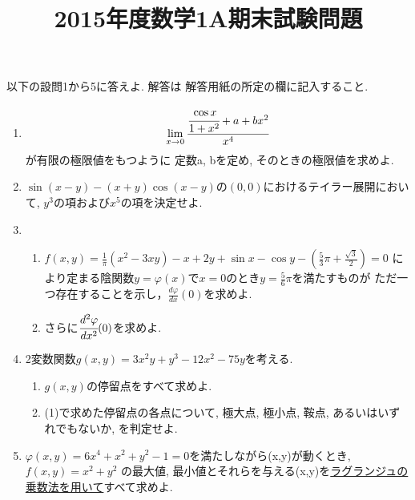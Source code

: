 \documentclass[a4paper,12pt,report]{amsart}
\title{2015年度数学1A期末試験問題}
\begin{document}
    \maketitle
以下の設問1から5に答えよ. 解答は 解答用紙の所定の欄に記入すること.
\begin{enumerate}
    \item 
    \begin{equation*}
        \lim_{x\to 0}\cfrac{\cfrac{\cos x}{1+x^{2}}+a+bx^{2}}{x^{4}}
    \end{equation*}
    が有限の極限値をもつように
    定数a, bを定め, そのときの極限値を求めよ.
    \item 
        \(\sin(x-y)-(x+y)\cos(x-y)\)の\((0,0)\)におけるテイラー展開において, \(y^{3}\)の項および\(x^{5}\)の項を決定せよ.
    \item 
    \begin{enumerate}
        \item \(f(x,y)=\frac{1}{\pi}(x^{2}-3xy)-x+2y+\sin{x}-\cos{y}-(\frac{5}{3}\pi+\frac{\sqrt{3}}{2})=0\)
        により定まる陰関数\(y=\varphi(x)\)で\(x=0\)のとき\(y=\frac{5}{6}\pi{}\)を満たすものが
        ただ一つ存在することを示し，\(\frac{d\varphi}{dx}(0)\)を求めよ.
        \item さらに\(\cfrac{d^{2}\varphi}{dx^{2}}(0)\)を求めよ.
    \end{enumerate}
    \item 
    2変数関数\(g(x,y)=3x^{2}y+y^{3}-12x^{2}-75y\)を考える.
    \begin{enumerate} 
        \item \(g(x,y)\)の停留点をすべて求めよ.
        \item (1)で求めた停留点の各点について, 極大点, 極小点, 鞍点, あるいはいずれでもないか, を判定せよ.
    \end{enumerate}
    \item \(\varphi(x,y)=6x^{4}+x^{2}+y^{2}-1=0\)を満たしながら(x,y)が動くとき, \(f(x,y)=x^{2}+y^{2}\)
    の最大値, 最小値とそれらを与える(x,y)を\underline{ラグランジュの乗数法を用いて}すべて求めよ.
	\end{enumerate}
\end{document}
